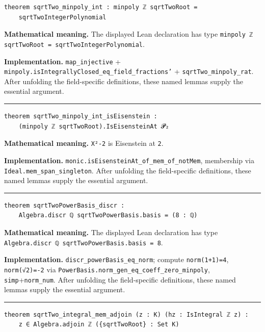 \documentclass[UTF8,a4paper,11pt,fontset=fandol]{ctexart}
\theoremstyle{definition}
\newcommand{\statementsep}{\par\medskip\hrule\medskip}
\begin{document}
\begin{verbatim}
theorem sqrtTwo_minpoly_int : minpoly ℤ sqrtTwoRoot =
    sqrtTwoIntegerPolynomial
\end{verbatim}
\noindent\textbf{Mathematical meaning.} The displayed Lean declaration has type \texttt{minpoly ℤ sqrtTwoRoot = sqrtTwoIntegerPolynomial}.\par
\noindent\textbf{Implementation.} \texttt{map\_\allowbreak{}injective} + \texttt{minpoly.\allowbreak{}isIntegrallyClosed\_\allowbreak{}eq\_\allowbreak{}field\_\allowbreak{}fractions'} + \texttt{sqrtTwo\_\allowbreak{}minpoly\_\allowbreak{}rat}. After unfolding the field-specific definitions, these named lemmas supply the essential argument.\par
\statementsep
\begin{verbatim}
theorem sqrtTwo_minpoly_int_isEisenstein :
    (minpoly ℤ sqrtTwoRoot).IsEisensteinAt 𝓟₂
\end{verbatim}
\noindent\textbf{Mathematical meaning.} \texttt{X²-2} is Eisenstein at \texttt{2}.\par
\noindent\textbf{Implementation.} \texttt{monic.\allowbreak{}isEisensteinAt\_\allowbreak{}of\_\allowbreak{}mem\_\allowbreak{}of\_\allowbreak{}notMem}, membership via \texttt{Ideal.\allowbreak{}mem\_\allowbreak{}span\_\allowbreak{}singleton}. After unfolding the field-specific definitions, these named lemmas supply the essential argument.\par
\statementsep
\begin{verbatim}
theorem sqrtTwoPowerBasis_discr :
    Algebra.discr ℚ sqrtTwoPowerBasis.basis = (8 : ℚ)
\end{verbatim}
\noindent\textbf{Mathematical meaning.} The displayed Lean declaration has type \texttt{Algebra.\allowbreak{}discr ℚ sqrtTwoPowerBasis.\allowbreak{}basis = 8}.\par
\noindent\textbf{Implementation.} \texttt{discr\_\allowbreak{}powerBasis\_\allowbreak{}eq\_\allowbreak{}norm}; compute \texttt{norm(1+1)=4}, \texttt{norm(√2)=-2} via \texttt{PowerBasis.\allowbreak{}norm\_\allowbreak{}gen\_\allowbreak{}eq\_\allowbreak{}coeff\_\allowbreak{}zero\_\allowbreak{}minpoly}, \texttt{simp}+\texttt{norm\_\allowbreak{}num}. After unfolding the field-specific definitions, these named lemmas supply the essential argument.\par
\statementsep
\begin{verbatim}
theorem sqrtTwo_integral_mem_adjoin (z : K) (hz : IsIntegral ℤ z) :
    z ∈ Algebra.adjoin ℤ ({sqrtTwoRoot} : Set K)
\end{verbatim}
\end{document}
